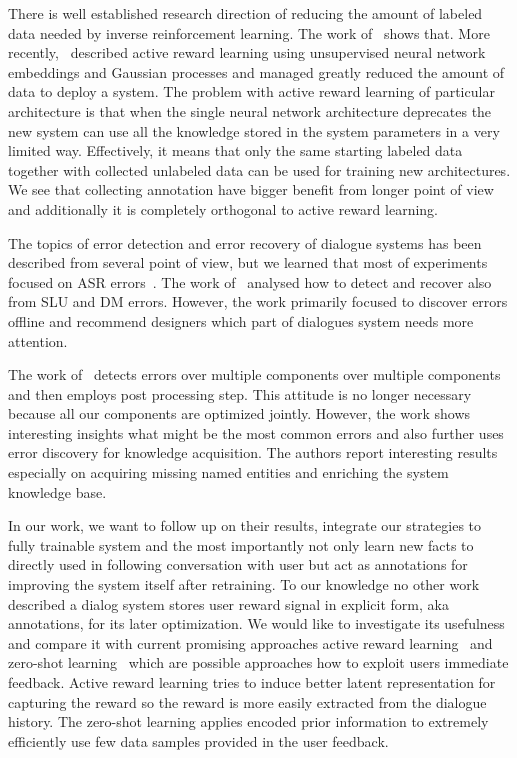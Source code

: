 \documentclass[11pt]{article}
\begin{document}
There is well established research direction of reducing the amount of labeled data needed by inverse reinforcement learning.
The work of~\cite{nouri_cultural_2012} shows that.
More recently,~\cite{su2016active} described active reward learning using unsupervised neural network embeddings and Gaussian processes and managed greatly reduced the amount of data to deploy a system.
The problem with active reward learning of particular architecture is that when the single neural network architecture deprecates the new system can use all the knowledge stored in the system parameters in a very limited way.
Effectively, it means that only the same starting labeled data together with collected unlabeled data can be used for training new architectures. 
We see that collecting annotation have bigger benefit from longer point of view and additionally it is completely orthogonal to active reward learning.

The topics of error detection and error recovery of dialogue systems has been described from several point of view, but we learned that most of experiments focused on ASR errors~\cite{skantze_error_2007}.
The work of~\cite{meena_data-driven_2016} analysed how to detect and recover also from SLU and DM errors.
However, the work primarily focused to discover errors offline and recommend designers which part of dialogues system needs more attention.

The work of~\cite{pappu_knowledge_2014} detects errors over multiple components over multiple components and then employs post processing step.
This attitude is no longer necessary because all our components are optimized jointly.
However, the work shows interesting insights what might be the most common errors and also further uses error discovery for knowledge acquisition.
The authors report interesting results especially on acquiring missing named entities and enriching the system knowledge base.

In our work, we want to follow up on their results, integrate our strategies to fully trainable system and the most importantly not only learn new facts to directly used in following conversation with user but act as annotations for improving the system itself after retraining.
To our knowledge no other work described a dialog system stores user reward signal in explicit form, aka annotations, for its later optimization.
We would like to investigate its usefulness and compare it with current promising approaches active reward learning~\cite{su2016active} and 
zero-shot learning~\cite{vinyals_matching_2016} which are possible approaches how to exploit users immediate feedback.
Active reward learning tries to induce better latent representation for capturing the reward so the reward is more easily extracted from the dialogue history.
The zero-shot learning applies encoded prior information to extremely efficiently use few data samples provided in the user feedback.
\end{document}
